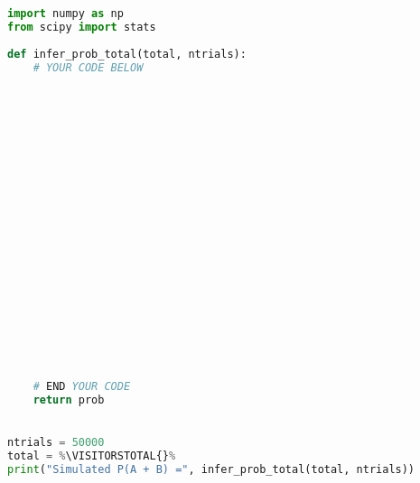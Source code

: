 \begin{lstlisting}[escapechar=\%, language=python,frame=single]
import numpy as np
from scipy import stats
		
def infer_prob_total(total, ntrials):
	# YOUR CODE BELOW





		
	
	
	
	










    
	# END YOUR CODE
	return prob
	

ntrials = 50000
total = %\VISITORSTOTAL{}%
print("Simulated P(A + B) =", infer_prob_total(total, ntrials))
\end{lstlisting}